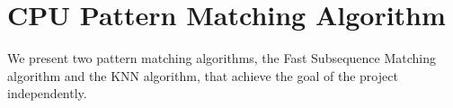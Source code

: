 \section{CPU Pattern Matching Algorithm}
\label{sec:algorithms}

We present two pattern matching algorithms, the Fast Subsequence Matching algorithm and the KNN algorithm, that achieve the goal of the project independently.


